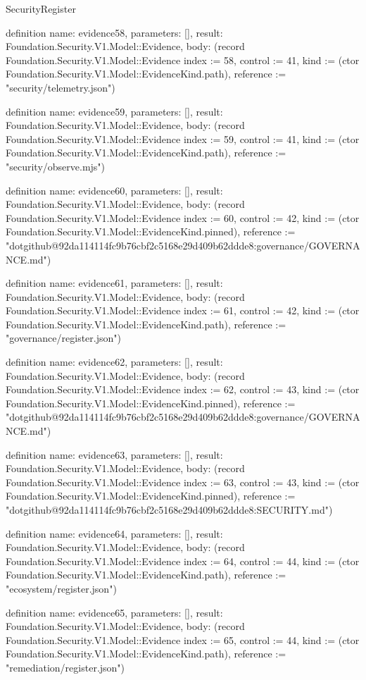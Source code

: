 \begin{lexlean}{SecurityRegister}
\begin{semanticmodule}
definition{
  name: evidence58,
  parameters: [],
  result: Foundation.Security.V1.Model::Evidence,
  body: (record Foundation.Security.V1.Model::Evidence {index := 58, control := 41, kind := (ctor Foundation.Security.V1.Model::EvidenceKind.path), reference := "security/telemetry.json"})
}

definition{
  name: evidence59,
  parameters: [],
  result: Foundation.Security.V1.Model::Evidence,
  body: (record Foundation.Security.V1.Model::Evidence {index := 59, control := 41, kind := (ctor Foundation.Security.V1.Model::EvidenceKind.path), reference := "security/observe.mjs"})
}

definition{
  name: evidence60,
  parameters: [],
  result: Foundation.Security.V1.Model::Evidence,
  body: (record Foundation.Security.V1.Model::Evidence {index := 60, control := 42, kind := (ctor Foundation.Security.V1.Model::EvidenceKind.pinned), reference := "dotgithub@92da114114fc9b76cbf2c5168e29d409b62ddde8:governance/GOVERNANCE.md"})
}

definition{
  name: evidence61,
  parameters: [],
  result: Foundation.Security.V1.Model::Evidence,
  body: (record Foundation.Security.V1.Model::Evidence {index := 61, control := 42, kind := (ctor Foundation.Security.V1.Model::EvidenceKind.path), reference := "governance/register.json"})
}

definition{
  name: evidence62,
  parameters: [],
  result: Foundation.Security.V1.Model::Evidence,
  body: (record Foundation.Security.V1.Model::Evidence {index := 62, control := 43, kind := (ctor Foundation.Security.V1.Model::EvidenceKind.pinned), reference := "dotgithub@92da114114fc9b76cbf2c5168e29d409b62ddde8:governance/GOVERNANCE.md"})
}

definition{
  name: evidence63,
  parameters: [],
  result: Foundation.Security.V1.Model::Evidence,
  body: (record Foundation.Security.V1.Model::Evidence {index := 63, control := 43, kind := (ctor Foundation.Security.V1.Model::EvidenceKind.pinned), reference := "dotgithub@92da114114fc9b76cbf2c5168e29d409b62ddde8:SECURITY.md"})
}

definition{
  name: evidence64,
  parameters: [],
  result: Foundation.Security.V1.Model::Evidence,
  body: (record Foundation.Security.V1.Model::Evidence {index := 64, control := 44, kind := (ctor Foundation.Security.V1.Model::EvidenceKind.path), reference := "ecosystem/register.json"})
}

definition{
  name: evidence65,
  parameters: [],
  result: Foundation.Security.V1.Model::Evidence,
  body: (record Foundation.Security.V1.Model::Evidence {index := 65, control := 44, kind := (ctor Foundation.Security.V1.Model::EvidenceKind.path), reference := "remediation/register.json"})
}


\end{semanticmodule}
\end{lexlean}
